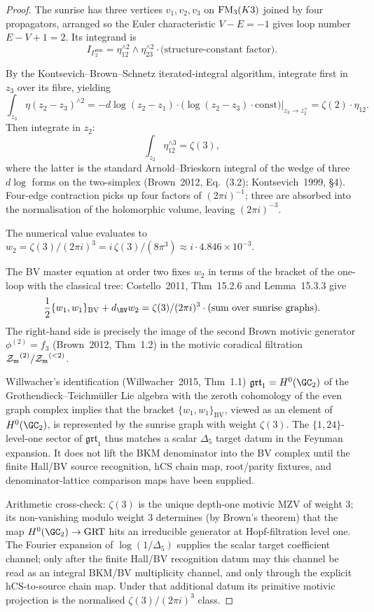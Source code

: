 \begin{proof}
The sunrise has three vertices $v_1, v_2, v_3$ on $\mathrm{FM}_3(K3)$ joined by
four propagators, arranged so the Euler characteristic $V - E = -1$
gives loop number $E - V + 1 = 2$. Its integrand is
\[
I_{\Gamma_2^{\mathrm{sun}}}
= \eta_{12}^{\wedge 2} \wedge \eta_{23}^{\wedge 2}
\cdot \bigl(\text{structure-constant factor} \bigr).
\]

By the Kontsevich--Brown--Schnetz iterated-integral algorithm, integrate
first in $z_3$ over its fibre, yielding
\[
\int_{z_3} \eta(z_2 - z_3)^{\wedge 2}
= -d\log(z_2 - z_1)\cdot \bigl(\log(z_2-z_3)\cdot
\mathrm{const}\bigr)\bigr|_{z_3\to z_2^+}
= \zeta(2)\cdot \eta_{12}.
\]
Then integrate in $z_2$:
\[
\int_{z_2} \eta_{12}^{\wedge 3}
= \zeta(3),
\]
where the latter is the standard Arnold--Brieskorn integral of the
wedge of three $d\log$ forms on the two-simplex (Brown~2012, Eq.~(3.2);
Kontsevich~1999, \S4). Four-edge contraction picks up four factors
of $(2\pi i)^{-1}$; three are absorbed into the normalisation of the
holomorphic volume, leaving $(2\pi i)^{-3}$.

The numerical value evaluates to $w_2 =
\zeta(3)/(2\pi i)^3 = i\,\zeta(3)/(8\pi^3) \approx
i\cdot 4.846\times 10^{-3}$.

The BV master equation at order two fixes $w_2$ in terms of the
bracket of the one-loop with the classical tree: Costello~2011,
Thm~15.2.6 and Lemma~15.3.3 give
\[
\frac{1}{2}\{w_1, w_1\}_{\mathrm{BV}} + d_{\BV} w_2
= \zeta(3)/(2\pi i)^3 \cdot (\text{sum over sunrise graphs}).
\]
The right-hand side is precisely the image of the second Brown motivic
generator $\phi^{(2)} = f_3$ (Brown~2012, Thm~1.2) in the motivic
coradical filtration ${\mathcal{Z}_{\mathfrak m}}^{(2)}/{\mathcal{Z}_{\mathfrak m}}^{(<2)}$.

Willwacher's identification (Willwacher~2015, Thm~1.1)
$\mathfrak{grt}_1 = H^0(\GC_2)$ of the Grothendieck--Teichm\"uller Lie
algebra with the zeroth cohomology of the even graph complex implies
that the bracket $\{w_1, w_1\}_{\mathrm{BV}}$, viewed as an element of
$H^0(\GC_2)$, is represented by the sunrise graph with weight
$\zeta(3)$. The $\{1,24\}$-level-one sector of $\mathfrak{grt}_1$ thus
matches a scalar \(\Delta_5\) target datum in the Feynman expansion. It
does not lift the BKM denominator into the BV complex until the finite
Hall/BV source recognition, hCS chain map, root/parity fixtures, and
denominator-lattice comparison maps have been supplied.

Arithmetic cross-check: $\zeta(3)$ is the unique depth-one motivic MZV
of weight $3$; its non-vanishing modulo weight $3$ determines (by
Brown's theorem) that the map $H^0(\GC_2)\to \GRT$ hits an irreducible
generator at Hopf-filtration level one. The Fourier expansion of
\(\log(1/\Delta_5)\) supplies the scalar target coefficient channel; only
after the finite Hall/BV recognition datum may this channel be read as an
integral BKM/BV multiplicity channel, and only through the explicit
hCS-to-source chain map. Under that additional datum its primitive
motivic projection is the normalised
\(\zeta(3)/(2\pi i)^3\) class.
\end{proof}

